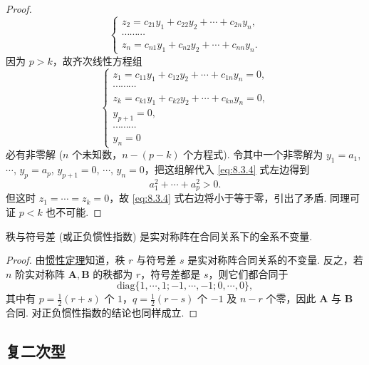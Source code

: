 \documentclass[../../main.tex]{subfiles}%
\begin{document}
\begin{proof}
\[\begin{cases}
z_2 = c_{21}y_1 + c_{22}y_2 + \cdots + c_{2n}y_n,\\
\cdots\cdots\cdots\\
z_n = c_{n1}y_1 + c_{n2}y_2 + \cdots + c_{nn}y_n.
\end{cases}
\]
因为 $p>k$，故齐次线性方程组
\[
\begin{cases}
z_1=c_{11}y_1 + c_{12}y_2 + \cdots + c_{1n}y_n = 0,\\
\cdots\cdots\cdots\\
z_k=c_{k1}y_1 + c_{k2}y_2 + \cdots + c_{kn}y_n = 0,\\
y_{p + 1} = 0,\\
\cdots\cdots\cdots\\
y_n = 0
\end{cases}
\]
必有非零解 ($n$ 个未知数，$n - (p - k)$ 个方程式). 令其中一个非零解为 $y_1 = a_1$, $\cdots$, $y_p = a_p$, $y_{p + 1} = 0$, $\cdots$, $y_n = 0$，把这组解代入 \eqref{eq:8.3.4} 式左边得到
\[
a_1^2+\cdots + a_p^2>0.
\]
但这时 $z_1 = \cdots = z_k = 0$，故 \eqref{eq:8.3.4} 式右边将小于等于零，引出了矛盾. 同理可证 $p<k$ 也不可能.

\end{proof}

\begin{theorem}\label{theorem:秩与符号差(或正负惯性指数)都是实对称阵在合同关系下的全系不变量}
秩与符号差 (或正负惯性指数) 是实对称阵在合同关系下的全系不变量.
\end{theorem}
\begin{proof}

由\hyperref[theorem:惯性定理]{惯性定理}知道，秩 $r$ 与符号差 $s$ 是实对称阵合同关系的不变量. 反之，若 $n$ 阶实对称阵 $\boldsymbol{A},\boldsymbol{B}$ 的秩都为 $r$，符号差都是 $s$，则它们都合同于
\[
\mathrm{diag}\{1,\cdots,1;-1,\cdots,-1;0,\cdots,0\},
\]
其中有 $p = \frac{1}{2}(r + s)$ 个 $1$，$q = \frac{1}{2}(r - s)$ 个 $-1$ 及 $n - r$ 个零，因此 $\boldsymbol{A}$ 与 $\boldsymbol{B}$ 合同. 对正负惯性指数的结论也同样成立. 

\end{proof}


\subsection{复二次型}
\end{document}
